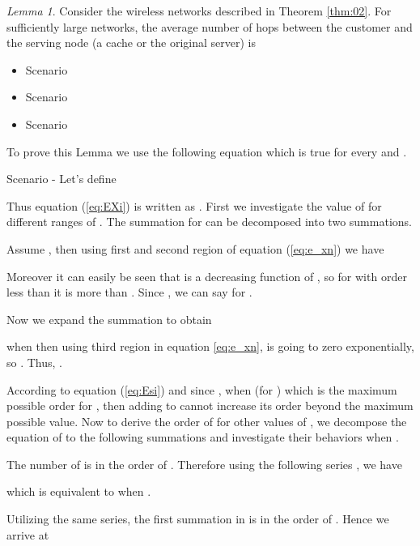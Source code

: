 \documentclass[journal]{IEEEtran}
\theoremstyle{plain}
\theoremstyle{remark}
\newtheorem{lemma}{Lemma}
\begin{document}
	\begin{lemma}\label{lem:02}
	Consider the wireless networks described in Theorem \ref{thm:02}. For sufficiently large networks, the average number of hops between the customer and the serving node (a cache or the original server) is 
	
	\begin{itemize}
		\item Scenario 
			

		\item Scenario 
		
	
		\item Scenario 
		
	
		\end{itemize}
\end{lemma}

\begin{IEEEproof}
To prove this Lemma we use the following equation which is true for every  and .


Scenario  - Let's define 


Thus equation (\ref{eq:EXi}) is written as .
First we investigate the value of  for different ranges of . The summation for  can be decomposed into two  summations.



Assume , then using first and second region of equation (\ref{eq:e_xn}) we have


Moreover it can easily be seen that  is a decreasing function of , so for  with order less than  it is more than . Since , we can say  for .

Now we expand the summation to obtain 




when  then using third region in equation \ref{eq:e_xn},  is going to zero exponentially, so . Thus, .



According to equation (\ref{eq:Esi}) and since , when  (for ) which is the maximum possible order for , then adding  to  cannot increase its order beyond the maximum possible value.
Now to derive the order of  for other values of , we decompose the equation of  to the following summations and investigate their behaviors when .



The number of  is in the order of . Therefore using the following series  , we have 

which is equivalent to  when .

Utilizing the same series, the first summation in  is in the order of . Hence we arrive at








\end{IEEEproof}
\end{document}
